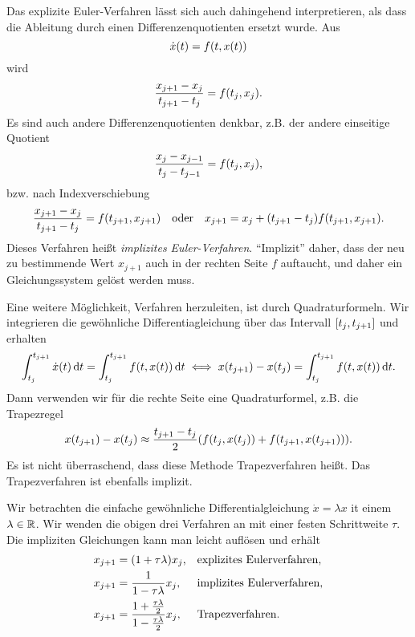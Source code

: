 \documentclass{lecture}
\begin{document}
	Das explizite Euler-Verfahren lässt sich auch dahingehend interpretieren, als dass die Ableitung durch einen Differenzenquotienten ersetzt wurde.
	Aus
	\[
		\dot{x}\parentheses*{t} = f\parentheses*{t, x\parentheses*{t}}
	\]
	wird
	\[
		\frac{x_{j + 1} - x_j}{t_{j + 1} - t_j} = f\parentheses*{t_j, x_j}.
	\]
	Es sind auch andere Differenzenquotienten denkbar, z.B. der andere einseitige Quotient
	\[
		\frac{x_j - x_{j - 1}}{t_j - t_{j - 1}} = f\parentheses*{t_j, x_j},
	\]
	bzw. nach Indexverschiebung
	\[
		\frac{x_{j + 1} - x_j}{t_{j + 1} - t_j} = f\parentheses*{t_{j + 1}, x_{j + 1}} \quad \text{oder} \quad x_{j + 1} = x_j + \parentheses*{t_{j + 1} - t_j}f\parentheses*{t_{j + 1}, x_{j + 1}}.
	\]
	Dieses Verfahren heißt \emph{implizites Euler-Verfahren}.
	``Implizit'' daher, dass der neu zu bestimmende Wert \(x_{j + 1}\) auch in der rechten Seite \(f\) auftaucht, und daher ein Gleichungssystem gelöst werden muss.

	Eine weitere Möglichkeit, Verfahren herzuleiten, ist durch Quadraturformeln.
	Wir integrieren die gewöhnliche Differentiagleichung über das Intervall \(\brackets*{t_j, t_{j + 1}}\) und erhalten
	\[
		\int_{t_j}^{t_{j + 1}}\dot{x}\parentheses*{t}\d t = \int_{t_j}^{t_{j + 1}}f\parentheses*{t, x\parentheses*{t}}\d t \iff x\parentheses*{t_{j + 1}} - x\parentheses*{t_j} = \int_{t_j}^{t_{j + 1}}f\parentheses*{t, x\parentheses*{t}}\d t.
	\]
	Dann verwenden wir für die rechte Seite eine Quadraturformel, z.B. die Trapezregel
	\[
		x\parentheses*{t_{j + 1}} - x\parentheses*{t_j} \approx \frac{t_{j + 1} - t_j}{2}\parentheses*{f\parentheses*{t_j, x\parentheses*{t_j}} + f\parentheses*{t_{j + 1}, x\parentheses*{t_{j + 1}}}}.
	\]
	Es ist nicht überraschend, dass diese Methode Trapezverfahren heißt.
	Das Trapezverfahren ist ebenfalls implizit.

	\begin{example}
		Wir betrachten die einfache gewöhnliche Differentialgleichung \(\dot{x} = \lambda x\) it einem \(\lambda \in \R\).
		Wir wenden die obigen drei Verfahren an mit einer festen Schrittweite \(\tau\).
		Die impliziten Gleichungen kann man leicht auflösen und erhält
		\begin{align*}
			x_{j + 1} &= \parentheses*{1 + \tau\lambda}x_j, &&\text{explizites Eulerverfahren},\\
			x_{j + 1} &= \frac{1}{1 - \tau\lambda}x_j, &&\text{implizites Eulerverfahren},\\
			x_{j + 1} &= \frac{1 + \frac{\tau\lambda}{2}}{1 - \frac{\tau\lambda}{2}}x_j, &&\text{Trapezverfahren}.
		\end{align*}
	\end{example}
\end{document}
